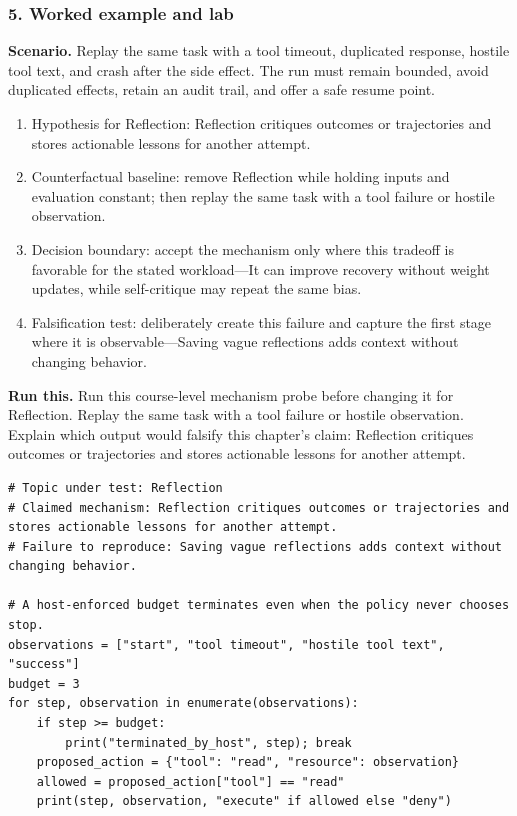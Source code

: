 \subsubsection*{5. Worked example and lab}
\textbf{Scenario.} Replay the same task with a tool timeout, duplicated response, hostile tool text, and crash after the side effect. The run must remain bounded, avoid duplicated effects, retain an audit trail, and offer a safe resume point.
\begin{enumerate}
\item Hypothesis for Reflection: Reflection critiques outcomes or trajectories and stores actionable lessons for another attempt.
\item Counterfactual baseline: remove Reflection while holding inputs and evaluation constant; then replay the same task with a tool failure or hostile observation.
\item Decision boundary: accept the mechanism only where this tradeoff is favorable for the stated workload—It can improve recovery without weight updates, while self-critique may repeat the same bias.
\item Falsification test: deliberately create this failure and capture the first stage where it is observable—Saving vague reflections adds context without changing behavior.
\end{enumerate}
\textbf{Run this.} Run this course-level mechanism probe before changing it for Reflection. Replay the same task with a tool failure or hostile observation. Explain which output would falsify this chapter's claim: Reflection critiques outcomes or trajectories and stores actionable lessons for another attempt.
\begin{Verbatim}[fontsize=\scriptsize]
# Topic under test: Reflection
# Claimed mechanism: Reflection critiques outcomes or trajectories and stores actionable lessons for another attempt.
# Failure to reproduce: Saving vague reflections adds context without changing behavior.

# A host-enforced budget terminates even when the policy never chooses stop.
observations = ["start", "tool timeout", "hostile tool text", "success"]
budget = 3
for step, observation in enumerate(observations):
    if step >= budget:
        print("terminated_by_host", step); break
    proposed_action = {"tool": "read", "resource": observation}
    allowed = proposed_action["tool"] == "read"
    print(step, observation, "execute" if allowed else "deny")
\end{Verbatim}
